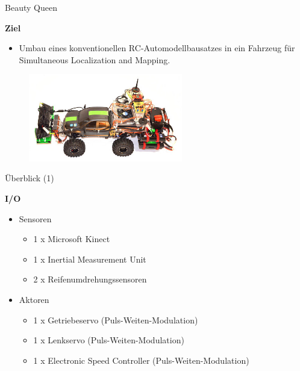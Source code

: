 \documentclass{beamer}
\begin{document}
\begin{frame}{Beauty Queen}
\begin{large}\textbf{Ziel}\end{large}
\begin{itemize}
	\item Umbau eines konventionellen RC-Automodellbausatzes in ein Fahrzeug f\"ur Simultaneous Localization and Mapping.
\end{itemize}
 \begin{figure}[H]
  \centering
  \includegraphics[width=0.6\textwidth]{./images/robot-beauty-queen.jpg}
 \end{figure}
\end{frame}
\begin{frame}{\"Uberblick (1)}
\begin{large}\textbf{I/O}\end{large}
\begin{itemize}
	\item Sensoren
	\begin{itemize}
		\item 1 x Microsoft Kinect
		\item 1 x Inertial Measurement Unit
		\item 2 x Reifenumdrehungssensoren
	\end{itemize}
	\item Aktoren
	\begin{itemize}
		\item 1 x Getriebeservo (Puls-Weiten-Modulation)
		\item 1 x Lenkservo (Puls-Weiten-Modulation)
		\item 1 x Electronic Speed Controller (Puls-Weiten-Modulation)
	\end{itemize}
\end{itemize}	
\end{frame}
\end{document}

